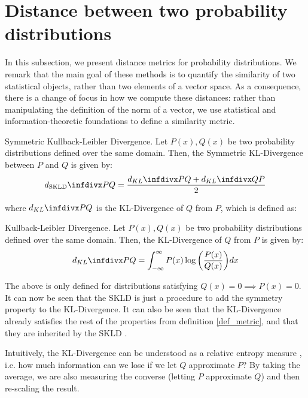 \documentclass[../main.tex]{subfiles}
\begin{document}
\section{Distance between two probability distributions}\label{subsection_pdfdist}
In this subsection, we present distance metrics for probability distributions. We remark that the main goal of these methods is to quantify the similarity of two statistical objects, rather than two elements of a vector space. As a consequence, there is a change of focus in how we compute these distances: rather than manipulating the definition of the norm of a vector, we use statistical and information-theoretic foundations to define a similarity metric. 
\begin{definition}{Symmetric Kullback-Leibler Divergence.} \label{def_skld1}
Let $P(x), Q(x)$ be two probability distributions defined over the same domain. Then, the Symmetric KL-Divergence between $P$ and $Q$ is given by:
\begin{align*}
d_{\text{SKLD}}\infdiv{P}{Q} = \frac{d_{KL}\infdiv{P}{Q} + d_{KL}\infdiv{Q}{P}}{2}
\end{align*}
\end{definition}
where $d_{KL}\infdiv{P}{Q}$ is the KL-Divergence of $Q$ from $P$, which is defined as:
\begin{definition}{Kullback-Leibler Divergence.} \label{def_kld1}
Let $P(x), Q(x)$ be two probability distributions defined over the same domain. Then, the KL-Divergence of $Q$ from $P$ is given by:
\begin{align*}
d_{KL}\infdiv{P}{Q} = \int_{-\infty}^{\infty}P(x)\log{\left(\frac{P(x)}{Q(x)}\right)}dx
\end{align*}
\end{definition}
\par The above is only defined for distributions satisfying $Q(x) = 0 \implies P(x) = 0$. It can now be seen that the SKLD is just a procedure to add the symmetry property to the KL-Divergence. It can also be seen that the KL-Divergence already satisfies the rest of the properties from definition \ref{def_metric}, and that they are inherited by the SKLD \cite{Hershey2007}. 
\par Intuitively, the KL-Divergence can be understood as a relative entropy measure \cite{Divergence2008}, i.e. how much information can we lose if we let $Q$ approximate $P$? By taking the average, we are also measuring the converse (letting $P$ approximate $Q$) and then re-scaling the result.
\end{document}
